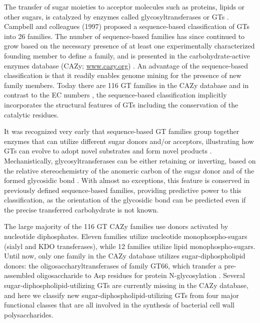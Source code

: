 \documentclass{article}
\begin{document}
The transfer of sugar moieties to acceptor molecules such as proteins, lipids or other sugars, is catalyzed by enzymes called glycosyltransferases or GTs \cite{lairson_glycosyltransferases_2008}. Campbell and colleagues (1997) proposed a sequence-based classification of GTs into 26 families. The number of sequence-based families has since continued to grow based on the necessary presence of at least one experimentally characterized founding member to define a family, and is presented in the carbohydrate-active enzymes database (CAZy; \url{www.cazy.org}) \cite{drula_carbohydrate-active_2022}. An advantage of the sequence-based classification is that it readily enables genome mining for the presence of new family members. Today there are 116 GT families in the CAZy database and in contrast to the EC numbers \cite{mcdonald_fifty-five_2014}, the sequence-based classification implicitly incorporates the structural features of GTs including the conservation of the catalytic residues. 

It was recognized very early that sequence-based GT families group together enzymes that can utilize different sugar donors and/or acceptors, illustrating how GTs can evolve to adopt novel substrates and form novel products \cite{campbell_classification_1997,coutinho_evolving_2003}. Mechanistically, glycosyltransferases can be either retaining or inverting, based on the relative stereochemistry of the anomeric carbon of the sugar donor and of the formed glycosidic bond \cite{lairson_glycosyltransferases_2008}. With almost no exceptions, this feature is conserved in previously defined sequence-based families, providing predictive power to this classification, as the orientation of the glycosidic bond can be predicted even if the precise transferred carbohydrate is not known.

The large majority of the 116 GT CAZy families use donors activated by nucleotide diphosphates. Eleven families utilize nucleotide monophospho-sugars (sialyl and KDO transferases), while 12 families utilize lipid monophospho-sugars. Until now, only one family in the CAZy database utilizes sugar-diphospholipid donors: the oligosaccharyltransferases of family GT66, which transfer a pre-assembled oligosaccharide to Asp residues for protein N-glycosylation \cite{lairson_glycosyltransferases_2008,knauer_oligosaccharyltransferase_1999}. Several sugar-diphospholipid-utilizing GTs are currently missing in the CAZy database, and here we classify new sugar-diphospholipid-utilizing GTs from four major functional classes that are all involved in the synthesis of bacterial cell wall polysaccharides.
\end{document}

